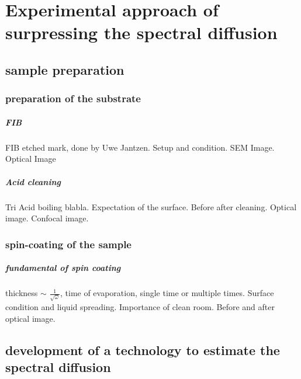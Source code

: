 \chapter[Experimental approach of surpressing the spectral diffusion]{Experimental approach of surpressing the spectral diffusion} %

\label{Chapter2} %


\section[sample preparation]{sample preparation}
\subsection{preparation of the substrate}
\paragraph{FIB}FIB etched mark, done by Uwe Jantzen. Setup and condition. SEM Image. Optical Image
\paragraph{Acid cleaning}Tri Acid boiling blabla. Expectation of the surface. Before after cleaning. Optical image. Confocal image.

\subsection{spin-coating of the sample}
\paragraph{fundamental of spin coating} thickness $\sim$ $\frac{1}{\sqrt{\omega}}$, time of evaporation, single time or multiple times. Surface condition and liquid spreading. Importance of clean room. Before and after optical image.
\section[development of a technology to estimate the spectral diffusion]{development of a technology to estimate the spectral diffusion}

